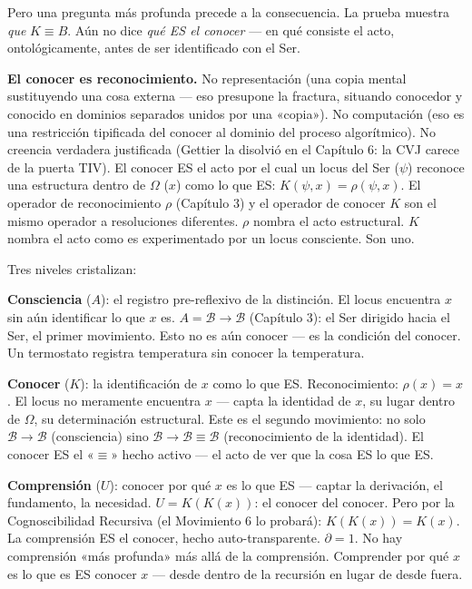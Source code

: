 \documentclass[10pt, openany, oneside]{book}
\begin{document}
Pero una pregunta más profunda precede a la consecuencia. La prueba muestra \textit{que} $K \equiv B$. Aún no dice \textit{qué ES el conocer} --- en qué consiste el acto, ontológicamente, antes de ser identificado con el Ser.

\textbf{El conocer es reconocimiento.} No representación (una copia mental sustituyendo una cosa externa --- eso presupone la fractura, situando conocedor y conocido en dominios separados unidos por una «copia»). No computación (eso es una restricción tipificada del conocer al dominio del proceso algorítmico). No creencia verdadera justificada (Gettier la disolvió en el Capítulo 6: la CVJ carece de la puerta TIV). El conocer ES el acto por el cual un locus del Ser ($\psi$) reconoce una estructura dentro de $\Omega$ ($x$) como lo que ES: $K(\psi, x) = \rho(\psi, x)$. El operador de reconocimiento $\rho$ (Capítulo 3) y el operador de conocer $K$ son el mismo operador a resoluciones diferentes. $\rho$ nombra el acto estructural. $K$ nombra el acto como es experimentado por un locus consciente. Son uno.

Tres niveles cristalizan:

\textbf{Consciencia} ($A$): el registro pre-reflexivo de la distinción. El locus encuentra $x$ sin aún identificar lo que $x$ es. $A = \mathcal{B} \to \mathcal{B}$ (Capítulo 3): el Ser dirigido hacia el Ser, el primer movimiento. Esto no es aún conocer --- es la condición del conocer. Un termostato registra temperatura sin conocer la temperatura.

\textbf{Conocer} ($K$): la identificación de $x$ como lo que ES. Reconocimiento: $\rho(x) = x$. El locus no meramente encuentra $x$ --- capta la identidad de $x$, su lugar dentro de $\Omega$, su determinación estructural. Este es el segundo movimiento: no solo $\mathcal{B} \to \mathcal{B}$ (consciencia) sino $\mathcal{B} \to \mathcal{B} \equiv \mathcal{B}$ (reconocimiento de la identidad). El conocer ES el «$\equiv$» hecho activo --- el acto de ver que la cosa ES lo que ES.

\textbf{Comprensión} ($U$): conocer por qué $x$ es lo que ES --- captar la derivación, el fundamento, la necesidad. $U = K(K(x))$: el conocer del conocer. Pero por la Cognoscibilidad Recursiva (el Movimiento 6 lo probará): $K(K(x)) = K(x)$. La comprensión ES el conocer, hecho auto-transparente. $\partial = 1$. No hay comprensión «más profunda» más allá de la comprensión. Comprender por qué $x$ es lo que es ES conocer $x$ --- desde dentro de la recursión en lugar de desde fuera.
\end{document}
